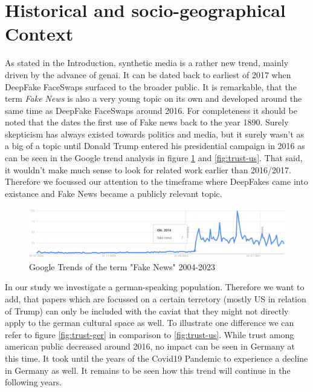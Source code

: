 \documentclass[
  a4paper,  %
  twoside,  %
  bibliography=totoc,
  headsepline,
  cleardoublepage=empty,
  parskip=half,
  draft=false
]{scrbook}
\begin{document}
\section{Historical and socio-geographical Context}
\label{sec:hist-context}
As stated in the Introduction, synthetic media is a rather new trend, mainly driven by the advance of \gls{genai}. It can be dated back to earliest of 2017 when DeepFake FaceSwaps surfaced to the broader public. It is remarkable, that the term \textit{Fake News} is also a very young topic on its own and developed around the same time as DeepFake FaceSwaps around 2016. For completeness it should be noted that the \citet{merriam-websterdictionaryRealStoryFake} dates the first use of Fake news back to the year 1890. Surely skepticism has always existed towards politics and media, but it surely wasn't as a big of a topic until Donald Trump entered his presidential campaign in 2016 as can be seen in the Google trend analysis in figure \ref{fig:gtrend-fake-news} and \ref{fig:trust-us}. That said, it wouldn't make much sense to look for related work earlier than 2016/2017. Therefore we focussed our attention to the timeframe where DeepFakes came into existance and Fake News became a publicly relevant topic.
\begin{figure}[h]
  \centering
  \includegraphics[width=1\textwidth]{./graphics/images/gtrends_fakenews_1011-2311.png}
  \caption{Google Trends of the term "Fake News" 2004-2023}
  \label{fig:gtrend-fake-news}
\end{figure}
In our study we investigate a german-speaking population. Therefore we want to add, that papers which are focussed on a certain terretory (mostly US in relation of Trump) can only be included with the caviat that they might not directly apply to the german cultural space as well. To illustrate one difference we can refer to figure \ref{fig:trust-ger} in comparison to \ref{fig:trust-us}. While trust among american public decreased around 2016, no impact can be seen in Germany at this time. It took until the years of the Covid19 Pandemic to experience a decline in Germany as well. It remains to be seen how this trend will continue in the following years.
\end{document}
